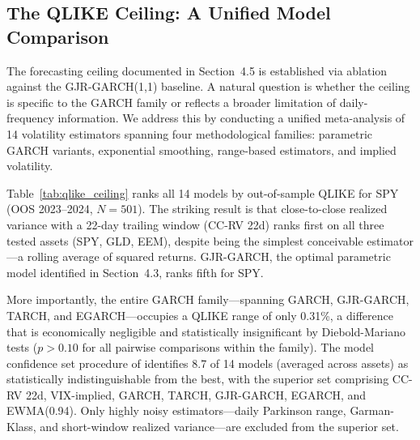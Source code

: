 
\subsection{The QLIKE Ceiling: A Unified Model Comparison}
\label{sec:qlike_ceiling}

The forecasting ceiling documented in Section~4.5 is established via ablation against the GJR-GARCH(1,1) baseline. A natural question is whether the ceiling is specific to the GARCH family or reflects a broader limitation of daily-frequency information. We address this by conducting a unified meta-analysis of 14 volatility estimators spanning four methodological families: parametric GARCH variants, exponential smoothing, range-based estimators, and implied volatility.

Table~\ref{tab:qlike_ceiling} ranks all 14 models by out-of-sample QLIKE for SPY (OOS 2023--2024, $N = 501$). The striking result is that close-to-close realized variance with a 22-day trailing window (CC-RV 22d) ranks first on all three tested assets (SPY, GLD, EEM), despite being the simplest conceivable estimator---a rolling average of squared returns. GJR-GARCH, the optimal parametric model identified in Section~4.3, ranks fifth for SPY.

More importantly, the entire GARCH family---spanning GARCH, GJR-GARCH, TARCH, and EGARCH---occupies a QLIKE range of only 0.31\%, a difference that is economically negligible and statistically insignificant by Diebold-Mariano tests ($p > 0.10$ for all pairwise comparisons within the family). The model confidence set procedure of \citet{hansen2005} identifies 8.7 of 14 models (averaged across assets) as statistically indistinguishable from the best, with the superior set comprising CC-RV 22d, VIX-implied, GARCH, TARCH, GJR-GARCH, EGARCH, and EWMA(0.94). Only highly noisy estimators---daily Parkinson range, Garman-Klass, and short-window realized variance---are excluded from the superior set.


